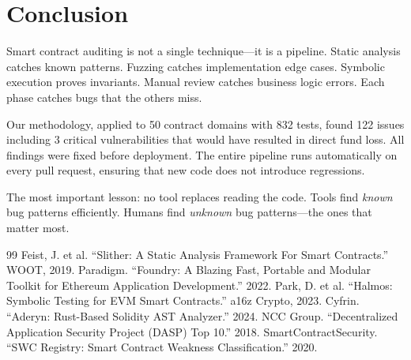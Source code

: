 \section{Conclusion}


Smart contract auditing is not a single technique---it is a pipeline. Static analysis
catches known patterns. Fuzzing catches implementation edge cases. Symbolic execution
proves invariants. Manual review catches business logic errors. Each phase catches bugs
that the others miss.

Our methodology, applied to 50 contract domains with 832 tests, found 122 issues
including 3 critical vulnerabilities that would have resulted in direct fund loss.
All findings were fixed before deployment. The entire pipeline runs automatically on
every pull request, ensuring that new code does not introduce regressions.

The most important lesson: no tool replaces reading the code. Tools find \emph{known}
bug patterns efficiently. Humans find \emph{unknown} bug patterns---the ones that matter
most.

\begin{thebibliography}{99}
 Feist, J. et al. ``Slither: A Static Analysis Framework For Smart Contracts.'' WOOT, 2019.
 Paradigm. ``Foundry: A Blazing Fast, Portable and Modular Toolkit for Ethereum Application Development.'' 2022.
 Park, D. et al. ``Halmos: Symbolic Testing for EVM Smart Contracts.'' a16z Crypto, 2023.
 Cyfrin. ``Aderyn: Rust-Based Solidity AST Analyzer.'' 2024.
 NCC Group. ``Decentralized Application Security Project (DASP) Top 10.'' 2018.
 SmartContractSecurity. ``SWC Registry: Smart Contract Weakness Classification.'' 2020.
\end{thebibliography}

